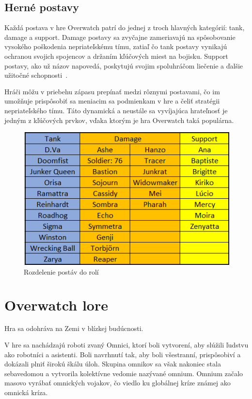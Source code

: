 \documentclass[10pt,oneside,slovak,a4paper]{article}
\begin{document}
\subsection{Herné postavy} \label{Herné postavy}

Každá postava v hre Overwatch patrí do jednej z troch hlavných kategórií: tank, damage a support. Damage postavy sa zvyčajne zameriavajú na spôsobovanie vysokého poškodenia nepriateľskému tímu, zatiaľ čo tank postavy vynikajú ochranou svojich spojencov a držaním kľúčových miest na bojisku. Support postavy, ako už názov napovedá, poskytujú svojim spoluhráčom liečenie a ďalšie užitočné schopnosti~\cite{Overwatchranked}.

Hráči môžu v priebehu zápasu prepínať medzi rôznymi postavami, čo im umožňuje prispôsobiť sa meniacim sa podmienkam v hre a čeliť stratégii nepriateľského tímu. Táto dynamická a neustále sa vyvíjajúca hrateľnosť je jedným z kľúčových prvkov, vďaka ktorým je hra Overwatch taká populárna.

\begin{figure}[h!]
\includegraphics[scale=1.25]{images/overwatch_postavy.png}
\caption{Rozdelenie postáv do rolí}
\end{figure}

\section{Overwatch lore} \label{Overwatch lore}

Hra sa odohráva na Zemi v blízkej budúcnosti. 

V hre sa nachádzajú roboti zvaný Omnici, ktorí boli vytvorení, aby slúžili ľudstvu ako robotníci a asistenti. Boli navrhnutí tak, aby boli všestranní, prispôsobiví a dokázali plniť širokú škálu úloh. Skupina omnikov sa však nakoniec stala sebavedomou a vytvorila kolektívne vedomie nazývané omnium. Omnium začalo masovo vyrábať omnických vojakov, čo viedlo ku globálnej kríze známej ako omnická kríza.
\end{document}
